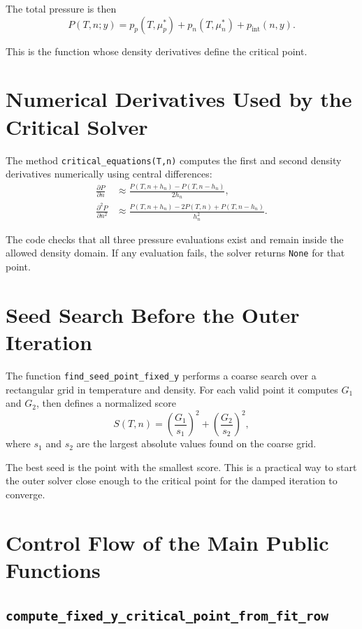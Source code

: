 \documentclass[11pt]{article}
\begin{document}
The total pressure is then
\begin{equation}
P(T,n;y) = p_p(T,\mu_p^\ast) + p_n(T,\mu_n^\ast) + p_{\mathrm{int}}(n,y).
\end{equation}

This is the function whose density derivatives define the critical point.

\section{Numerical Derivatives Used by the Critical Solver}

The method \texttt{critical\_equations(T,n)} computes the first and second
density derivatives numerically using central differences:
\begin{align}
\frac{\partial P}{\partial n}
&\approx \frac{P(T,n+h_n)-P(T,n-h_n)}{2h_n}, \\
\frac{\partial^2 P}{\partial n^2}
&\approx \frac{P(T,n+h_n)-2P(T,n)+P(T,n-h_n)}{h_n^2}.
\end{align}

The code checks that all three pressure evaluations exist and remain inside the
allowed density domain. If any evaluation fails, the solver returns
\texttt{None} for that point.

\section{Seed Search Before the Outer Iteration}

The function \texttt{find\_seed\_point\_fixed\_y} performs a coarse search over
a rectangular grid in temperature and density. For each valid point it computes
$G_1$ and $G_2$, then defines a normalized score
\begin{equation}
S(T,n) =
\left(\frac{G_1}{s_1}\right)^2 +
\left(\frac{G_2}{s_2}\right)^2,
\end{equation}
where $s_1$ and $s_2$ are the largest absolute values found on the coarse grid.

The best seed is the point with the smallest score. This is a practical way to
start the outer solver close enough to the critical point for the damped
iteration to converge.

\section{Control Flow of the Main Public Functions}

\subsection{\texttt{compute\_fixed\_y\_critical\_point\_from\_fit\_row}}
\end{document}
